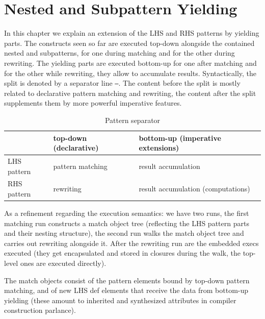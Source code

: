 \chapter{Nested and Subpattern Yielding}%
\label{cha:yielding}

In this chapter we explain an extension of the LHS and RHS patterns by yielding parts.
The constructs seen so far are executed top-down alongside the contained nested and subpatterns, for one during matching and for the other during rewriting.
The yielding parts are executed bottom-up for one after matching and for the other while rewriting, they allow to accumulate results.
Syntactically, the split is denoted by a separator line \texttt{---}.
The content before the split is mostly related to declarative pattern matching and rewriting, the content after the split supplements them by more powerful imperative features.

\begin{table}[htbp]
  \centering
  \begin{tabularx}{\linewidth}{|l|X|X|} 
		\hline
     & top-down (declarative) & bottom-up (imperative extensions) \\
		\hline
    LHS pattern & pattern matching & result accumulation \\
		\hline
    RHS pattern & rewriting & result accumulation (computations) \\
		\hline
  \end{tabularx}
  \caption{Pattern separator}
  \label{patternsepar}
\end{table}

As a refinement regarding the execution semantics:
we have two runs, the first matching run constructs a match object tree (reflecting the LHS pattern parts and their nesting structure),
the second run walks the match object tree and carries out rewriting alongside it.
After the rewriting run are the embedded execs executed (they get encapsulated and stored in closures during the walk, the top-level ones are executed directly).

The match objects consist of the pattern elements bound by top-down pattern matching,
and of new LHS def elements that receive the data from bottom-up yielding
(these amount to inherited and synthesized attributes in compiler construction parlance).

